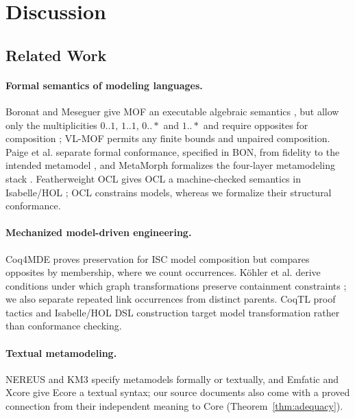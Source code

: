 \section{Discussion}\label{sec:discussion}

\subsection{Related Work}
\paragraph{Formal semantics of modeling languages.}
Boronat and Meseguer give MOF an executable algebraic semantics
\cite{boronat_meseguer_2010}, but allow only the multiplicities $0..1$, $1..1$,
$0..\ast$ and $1..\ast$ and require opposites for composition
\cite{boronat_meseguer_report}; VL-MOF permits any finite bounds and
unpaired composition. Paige et al. separate formal conformance, specified in BON,
from fidelity to the intended metamodel \cite{paige_brooke_ostroff_2007}, and
MetaMorph formalizes the four-layer metamodeling stack \cite{doller_2022}.
Featherweight OCL gives OCL a machine-checked semantics in Isabelle/HOL
\cite{brucker_wolff_2012}; OCL constrains models,
whereas we formalize their structural conformance.

\paragraph{Mechanized model-driven engineering.}
Coq4MDE proves preservation for ISC model composition
\cite{kezadri_etal_2014} but compares opposites by membership,
where we count occurrences. K\"ohler et al. derive conditions under which graph
transformations preserve containment constraints
\cite{koehler_lewin_taentzer_2007}; we also separate repeated link occurrences
from distinct parents. CoqTL proof tactics \cite{cohen_tisi_douence_2024} and
Isabelle/HOL DSL construction \cite{brucker_tuong_wolff_2020} target model
transformation rather than conformance checking.

\paragraph{Textual metamodeling.}
NEREUS \cite{favre_duarte_2016} and KM3 \cite{jouault_bezivin_2006} specify
metamodels formally or textually, and Emfatic \cite{emfatic_docs} and Xcore
\cite{xcore_docs} give Ecore a textual syntax; our source documents also come
with a proved connection from their independent meaning to Core
(Theorem~\ref{thm:adequacy}).

